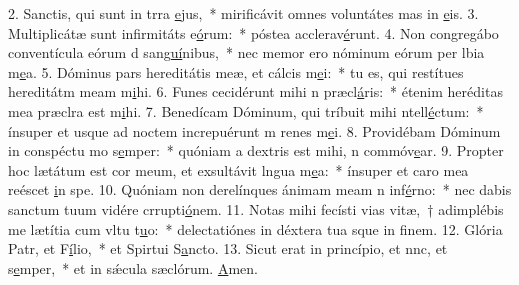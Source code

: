 2. Sanctis, qui sunt in trra \uline{e}jus,~* mirificávit omnes voluntátes mas in \uline{e}is.
3. Multiplicátæ sunt infirmitáts e\uline{ó}rum:~* póstea acclerav\uline{é}runt.
4. Non congregábo conventícula eórum d san\uline{guí}nibus,~* nec memor ero nóminum eórum per lbia m\uline{e}a.
5. Dóminus pars hereditátis meæ, et cálcis m\uline{e}i:~* tu es, qui restítues hereditátm meam m\uline{i}hi.
6. Funes cecidérunt mihi n præcl\uline{á}ris:~* étenim heréditas mea præclra est m\uline{i}hi.
7. Benedícam Dóminum, qui tríbuit mihi ntell\uline{é}ctum:~* ínsuper et usque ad noctem increpuérunt m renes m\uline{e}i.
8. Providébam Dóminum in conspéctu mo s\uline{e}mper:~* quóniam a dextris est mihi, n commóv\uline{e}ar.
9. Propter hoc lætátum est cor meum, et exsultávit lngua m\uline{e}a:~* ínsuper et caro mea reéscet \uline{i}n spe.
10. Quóniam non derelínques ánimam meam n inf\uline{é}rno:~* nec dabis sanctum tuum vidére crrupti\uline{ó}nem.
11. Notas mihi fecísti vias vitæ,~† adimplébis me lætítia cum vltu t\uline{u}o:~* delectatiónes in déxtera tua sque in f\uline{i}nem.
12. Glória Patr, et F\uline{í}lio,~* et Spirtui S\uline{a}ncto.
13. Sicut erat in princípio, et nnc, et s\uline{e}mper,~* et in sǽcula sæclórum. \uline{A}men.
